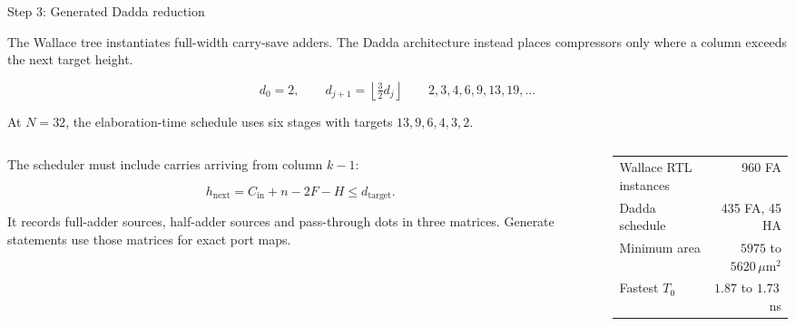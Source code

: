 \documentclass[aspectratio=169,11pt]{beamer}
\newcommand{\umarea}{\ensuremath{\,\mu\mathrm{m}^{2}}}
\begin{document}
\begin{frame}{Step 3: Generated Dadda reduction}

The Wallace tree instantiates full-width carry-save adders. The Dadda
architecture instead places compressors only where a column exceeds the next
target height.

\[
d_0=2,\qquad d_{j+1}=\left\lfloor\tfrac{3}{2}d_j\right\rfloor
\qquad 2,3,4,6,9,13,19,\ldots
\]

At $N=32$, the elaboration-time schedule uses six stages with targets
$13,9,6,4,3,2$.

\vspace{3pt}
\begin{columns}[T]
\begin{column}{0.54\textwidth}
\small
The scheduler must include carries arriving from column $k-1$:

\[
h_{\text{next}}=C_{\text{in}}+n-2F-H\leq d_{\text{target}}.
\]

It records full-adder sources, half-adder sources and pass-through dots in
three matrices. Generate statements use those matrices for exact port maps.
\end{column}

\begin{column}{0.42\textwidth}
\scriptsize
\begin{tabular}{@{}lr@{}}
Wallace RTL instances & 960 FA \\
Dadda schedule & 435 FA, 45 HA \\
\addlinespace
Minimum area & $5975$ to $5620\umarea$ \\
Fastest $T_0$ & $1.87$ to $1.73$\,ns \\
\end{tabular}
\end{column}
\end{columns}

\end{frame}
\end{document}
